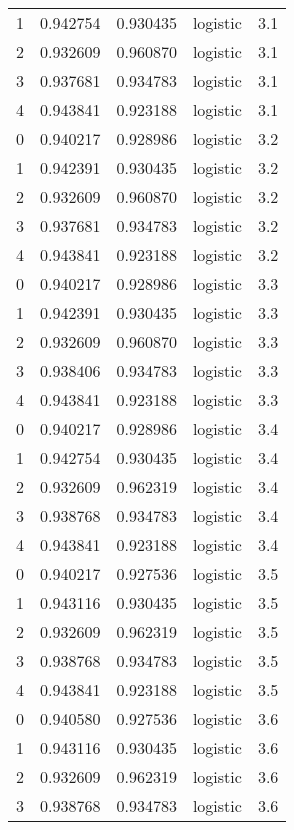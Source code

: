 \begin{tabular}{rrrlr}
     1 & 0.942754 & 0.930435 & logistic &        3.1 \\
     2 & 0.932609 & 0.960870 & logistic &        3.1 \\
     3 & 0.937681 & 0.934783 & logistic &        3.1 \\
     4 & 0.943841 & 0.923188 & logistic &        3.1 \\
     0 & 0.940217 & 0.928986 & logistic &        3.2 \\
     1 & 0.942391 & 0.930435 & logistic &        3.2 \\
     2 & 0.932609 & 0.960870 & logistic &        3.2 \\
     3 & 0.937681 & 0.934783 & logistic &        3.2 \\
     4 & 0.943841 & 0.923188 & logistic &        3.2 \\
     0 & 0.940217 & 0.928986 & logistic &        3.3 \\
     1 & 0.942391 & 0.930435 & logistic &        3.3 \\
     2 & 0.932609 & 0.960870 & logistic &        3.3 \\
     3 & 0.938406 & 0.934783 & logistic &        3.3 \\
     4 & 0.943841 & 0.923188 & logistic &        3.3 \\
     0 & 0.940217 & 0.928986 & logistic &        3.4 \\
     1 & 0.942754 & 0.930435 & logistic &        3.4 \\
     2 & 0.932609 & 0.962319 & logistic &        3.4 \\
     3 & 0.938768 & 0.934783 & logistic &        3.4 \\
     4 & 0.943841 & 0.923188 & logistic &        3.4 \\
     0 & 0.940217 & 0.927536 & logistic &        3.5 \\
     1 & 0.943116 & 0.930435 & logistic &        3.5 \\
     2 & 0.932609 & 0.962319 & logistic &        3.5 \\
     3 & 0.938768 & 0.934783 & logistic &        3.5 \\
     4 & 0.943841 & 0.923188 & logistic &        3.5 \\
     0 & 0.940580 & 0.927536 & logistic &        3.6 \\
     1 & 0.943116 & 0.930435 & logistic &        3.6 \\
     2 & 0.932609 & 0.962319 & logistic &        3.6 \\
     3 & 0.938768 & 0.934783 & logistic &        3.6 \\

\end{tabular}
